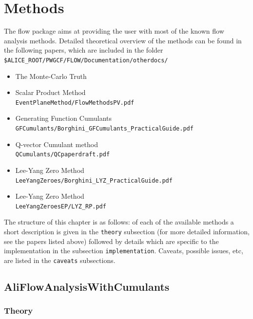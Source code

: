 \documentclass[a4paper]{book}
\numberwithin{equation}{subsection}
\begin{document}
\chapter{Methods}
\label{Methods}
The flow package aims at providing the user with most of the known flow analysis methods. Detailed theoretical overview of the methods can be found in the following papers, which are included in the folder \texttt{\$ALICE\_ROOT/PWGCF/FLOW/Documentation/otherdocs/}
\begin{itemize}
	\item The Monte-Carlo Truth
	\item Scalar Product Method \\ \hspace*{1cm} \texttt{EventPlaneMethod/FlowMethodsPV.pdf}
	\item Generating Function Cumulants \\ \hspace*{1cm} \texttt{GFCumulants/Borghini\_GFCumulants\_PracticalGuide.pdf}
	\item Q-vector Cumulant method \\ \hspace*{1cm} \texttt{QCumulants/QCpaperdraft.pdf} 
        \item Lee-Yang Zero Method \\ \hspace*{1cm} \texttt{LeeYangZeroes/Borghini\_LYZ\_PracticalGuide.pdf}
	\item Lee-Yang Zero Method \\ \hspace*{1cm} \texttt{LeeYangZeroesEP/LYZ\_RP.pdf}
\end{itemize}
The structure of this  chapter is as follows: of each of the available methods a short description is given in the \texttt{theory} subsection (for more detailed information, see the papers listed above) followed by details which are specific to the implementation in the subsection \texttt{implementation}. Caveats, possible issues, etc, are listed in the \texttt{caveats} subsections. 

\section{AliFlowAnalysisWithCumulants}
\subsection{Theory}
\end{document}
